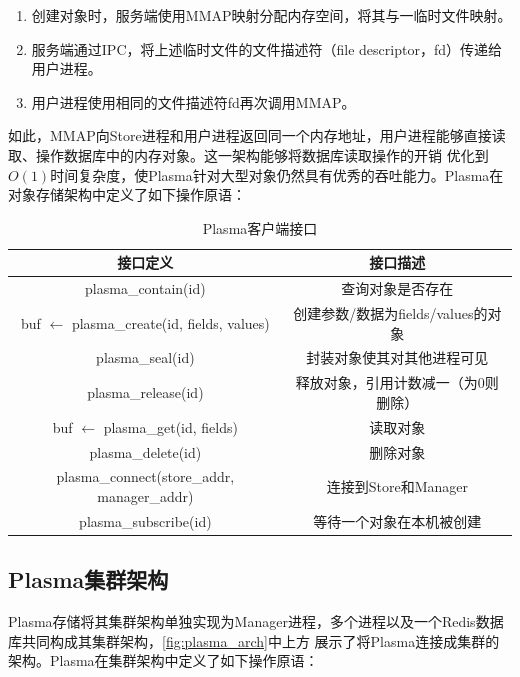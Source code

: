 \begin{enumerate}
    \item 创建对象时，服务端使用MMAP映射分配内存空间，将其与一临时文件映射。
    \item 服务端通过IPC，将上述临时文件的文件描述符（file descriptor，fd）传递给用户进程。
    \item 用户进程使用相同的文件描述符fd再次调用MMAP。
\end{enumerate}

如此，MMAP向Store进程和用户进程返回同一个内存地址，用户进程能够直接读取、操作数据库中的内存对象。这一架构能够将数据库读取操作的开销
优化到$O(1)$时间复杂度，使Plasma针对大型对象仍然具有优秀的吞吐能力。Plasma在对象存储架构中定义了如下操作原语：

\begin{table}[h]
    \centering
    \caption{Plasma客户端接口}
    \begin{tabular}{*{2}{c}}
        \toprule
        接口定义 & 接口描述      \\
        \midrule
        plasma\_contain(id)                                    & 查询对象是否存在   \\
        buf $\leftarrow$ plasma\_create(id, fields, values)    & 创建参数/数据为fields/values的对象   \\
        plasma\_seal(id)                                       & 封装对象使其对其他进程可见   \\
        plasma\_release(id)                                    & 释放对象，引用计数减一（为0则删除）   \\
        buf $\leftarrow$ plasma\_get(id, fields)               & 读取对象   \\
        plasma\_delete(id)                                     & 删除对象   \\
        \midrule
        plasma\_connect(store\_addr, manager\_addr)            & 连接到Store和Manager \\
        plasma\_subscribe(id)                                  & 等待一个对象在本机被创建 \\ 
        \bottomrule
    \end{tabular}
    \label{tab:store_api}
\end{table}

\subsection{Plasma集群架构}

Plasma存储将其集群架构单独实现为Manager进程，多个进程以及一个Redis数据库共同构成其集群架构，\autoref{fig:plasma_arch}中上方
展示了将Plasma连接成集群的架构。Plasma在集群架构中定义了如下操作原语：

